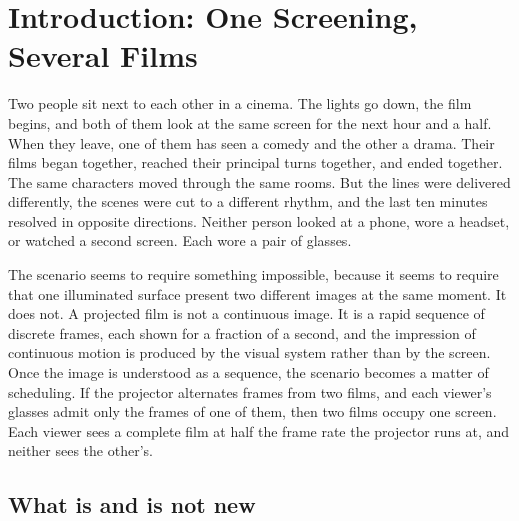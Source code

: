 \chapter*{Introduction: One Screening, Several Films}

Two people sit next to each other in a cinema. The lights go down, the film begins, and both of them look at the same screen for the next hour and a half. When they leave, one of them has seen a comedy and the other a drama. Their films began together, reached their principal turns together, and ended together. The same characters moved through the same rooms. But the lines were delivered differently, the scenes were cut to a different rhythm, and the last ten minutes resolved in opposite directions. Neither person looked at a phone, wore a headset, or watched a second screen. Each wore a pair of glasses.

The scenario seems to require something impossible, because it seems to require that one illuminated surface present two different images at the same moment. It does not. A projected film is not a continuous image. It is a rapid sequence of discrete frames, each shown for a fraction of a second, and the impression of continuous motion is produced by the visual system rather than by the screen. Once the image is understood as a sequence, the scenario becomes a matter of scheduling. If the projector alternates frames from two films, and each viewer's glasses admit only the frames of one of them, then two films occupy one screen. Each viewer sees a complete film at half the frame rate the projector runs at, and neither sees the other's.

\section*{What is and is not new}


